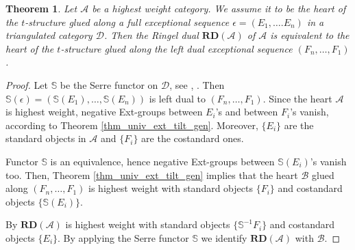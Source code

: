\documentclass[12pt,a4paper]{amsart}
\newcommand{\aA}{{\mathcal{A}}}
\newcommand{\bB}{{\mathcal{B}}}
\newcommand{\dD}{{\mathcal{D}}}
\newcommand{\tr}{{\mbox{$t$-struc}\-tu\-r}}
\newtheorem{THM}[LEM]{Theorem}
\theoremstyle{definition}
\begin{document}
\begin{THM}\label{thm_Ringel} Let $\aA$ be a highest weight category. We assume it to be the heart of the \tr e glued along a full exceptional sequence $\epsilon=(E_1,\dots . E_n)$ in a triangulated category  $\dD$.
Then the Ringel dual $\mathbf{RD}(\aA)$ of $\aA$ is equivalent to the heart of the \tr e glued along the left dual exceptional sequence $( F_n, \ldots, F_1 )$.
\end{THM}
\begin{proof}
	Let $\mathbb{S}$ be the Serre functor on $\dD$, see \cite{B}, \cite{BK1}. Then $\mathbb{S}(\epsilon) = ( \mathbb{S}(E_1), \ldots, \mathbb{S}(E_n) )$ is left dual to $( F_n,\ldots, F_1 )$.  Since the heart $\aA$ is highest weight, negative Ext-groups between $E_i$'s and between  $F_i$'s vanish, according to Theorem \ref{thm_univ_ext_tilt_gen}. Moreover, $\{E_i\}$ are the standard objects in $\aA$ and $\{F_i\}$ are the costandard ones.
	
	Functor $\mathbb{S}$ is an equivalence, hence negative Ext-groups between  $\mathbb{S}(E_i)$'s vanish too. Then, Theorem \ref{thm_univ_ext_tilt_gen} implies that the heart $\bB$ glued along $(F_n,\dots , F_1)$ is highest weight with standard objects $\{F_i\}$ and costandard objects $\{\mathbb{S}(E_i)\}$.
	
	By \cite[Theorem 6.3]{BodBon4} $\mathbf{RD}(\aA)$ is highest weight with standard objects $\{\mathbb{S}^{-1} F_i\}$ and costandard objects $\{E_i\}$.
	By applying the Serre functor $\mathbb{S}$ we identify $\mathbf{RD}(\aA)$ with $\bB$.
\end{proof}
\end{document}
